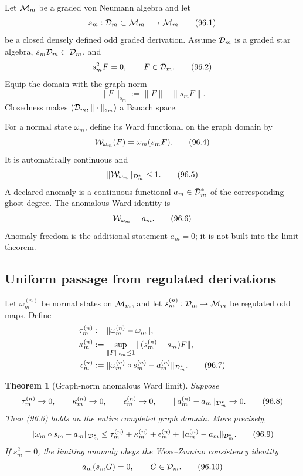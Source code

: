 \documentclass[11pt]{article}
\newtheorem{theorem}{Theorem}[section]
\theoremstyle{remark}
\begin{document}
Let \({\cal M}_m\) be a graded von Neumann algebra and let
\[
 s_m:{\cal D}_m\subset{\cal M}_m\longrightarrow{\cal M}_m        \tag{96.1}
\]
be a closed densely defined odd graded derivation.  Assume
\({\cal D}_m\) is a graded star algebra,
\(s_m{\cal D}_m\subset{\cal D}_m\), and
\[
 s_m^2F=0,\qquad F\in{\cal D}_m.                                 \tag{96.2}
\]
Equip the domain with the graph norm
\[
 \|F\|_{s_m}:=\|F\|+\|s_mF\|.                                   \tag{96.3}
\]
Closedness makes \(({\cal D}_m,\|\cdot\|_{s_m})\) a Banach space.

For a normal state \(\omega_m\), define its Ward functional on the
graph domain by
\[
 {\cal W}_{\omega_m}(F)=\omega_m(s_mF).                          \tag{96.4}
\]
It is automatically continuous and
\[
 \|{\cal W}_{\omega_m}\|_{{\cal D}_m^*}\leq1.                    \tag{96.5}
\]
A declared anomaly is a continuous functional
\(a_m\in{\cal D}_m^*\) of the corresponding ghost degree.  The
anomalous Ward identity is
\[
 {\cal W}_{\omega_m}=a_m.                                       \tag{96.6}
\]
Anomaly freedom is the additional statement \(a_m=0\); it is not
built into the limit theorem.

\subsection{Uniform passage from regulated derivations}

Let \(\omega_m^{(n)}\) be normal states on \({\cal M}_m\), and let
\(s_m^{(n)}:{\cal D}_m\to{\cal M}_m\) be regulated odd maps.  Define
\[
 \begin{split}
 \tau_m^{(n)}
 &:=\|\omega_m^{(n)}-\omega_m\|,\\
 \kappa_m^{(n)}
 &:=\sup_{\|F\|_{s_m}\leq1}
       \|(s_m^{(n)}-s_m)F\|,\\
 \epsilon_m^{(n)}
 &:=\|\omega_m^{(n)}\circ s_m^{(n)}
                   -a_m^{(n)}\|_{{\cal D}_m^*}.                  \tag{96.7}
 \end{split}
\]

\begin{theorem}[Graph-norm anomalous Ward limit]
\label{thm:v12v96-graph}
Suppose
\[
 \tau_m^{(n)}\to0,\qquad
 \kappa_m^{(n)}\to0,\qquad
 \epsilon_m^{(n)}\to0,\qquad
 \|a_m^{(n)}-a_m\|_{{\cal D}_m^*}\to0.                           \tag{96.8}
\]
Then (96.6) holds on the entire completed graph domain.  More
precisely,
\[
 \|\omega_m\circ s_m-a_m\|_{{\cal D}_m^*}
 \leq
 \tau_m^{(n)}+\kappa_m^{(n)}
 +\epsilon_m^{(n)}
 +\|a_m^{(n)}-a_m\|_{{\cal D}_m^*}.                              \tag{96.9}
\]
If \(s_m^2=0\), the limiting anomaly obeys the
Wess--Zumino consistency identity
\[
 a_m(s_mG)=0,\qquad G\in{\cal D}_m.                              \tag{96.10}
\]
\end{theorem}
\end{document}
